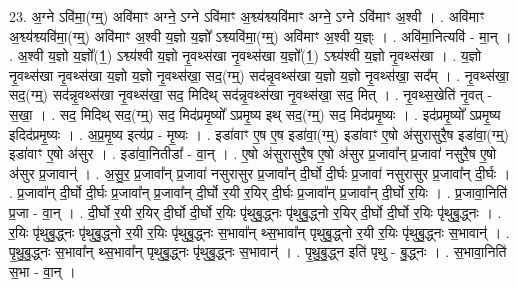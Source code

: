 \documentclass[17pt]{extarticle}
\begin{document}
23. अ॒ग्ने ऽवि॑मा॒(ग्म्॒) अवि॑माꣳ अग्ने॒ ऽग्ने ऽवि॑माꣳ अ॒श्व्य॑श्व्यवि॑माꣳ अग्ने॒ ऽग्ने ऽवि॑माꣳ अ॒श्वी । . अवि॑माꣳ अ॒श्व्य॑श्व्यवि॑मा॒(ग्म्॒) अवि॑माꣳ अ॒श्वी य॒ज्ञो य॒ज्ञो᳚ ऽश्व्यवि॑मा॒(ग्म्॒) अवि॑माꣳ अ॒श्वी य॒ज्ञ्ः । . अवि॑मा॒नित्यवि॑ - मा॒न् । . अ॒श्वी य॒ज्ञो य॒ज्ञो᳚(1॒) ऽश्व्य॑श्वी य॒ज्ञो नृ॒वथ्स॑खा नृ॒वथ्स॑खा य॒ज्ञो᳚(1॒) ऽश्व्य॑श्वी य॒ज्ञो नृ॒वथ्स॑खा । . य॒ज्ञो नृ॒वथ्स॑खा नृ॒वथ्स॑खा य॒ज्ञो य॒ज्ञो नृ॒वथ्स॑खा॒ सद॒(ग्म्॒) सद॑न्नृ॒वथ्स॑खा य॒ज्ञो य॒ज्ञो नृ॒वथ्स॑खा॒ सद᳚म् । . नृ॒वथ्स॑खा॒ सद॒(ग्म्॒) सद॑न्नृ॒वथ्स॑खा नृ॒वथ्स॑खा॒ सद॒ मिदिथ् सद॑न्नृ॒वथ्स॑खा नृ॒वथ्स॑खा॒ सद॒ मित् । . नृ॒वथ्स॒खेति॑ नृ॒वत् - स॒खा॒ । . सद॒ मिदिथ् सद॒(ग्म्॒) सद॒ मिद॑प्रमृ॒ष्यो᳚ ऽप्रमृ॒ष्य इथ् सद॒(ग्म्॒) सद॒ मिद॑प्रमृ॒ष्यः । . इद॑प्रमृ॒ष्यो᳚ ऽप्रमृ॒ष्य इदिद॑प्रमृ॒ष्यः । . अ॒प्र॒मृ॒ष्य इत्य॑प्र - मृ॒ष्यः । . इडा॑वाꣳ ए॒ष ए॒ष इडा॑वा॒(ग्म्॒) इडा॑वाꣳ ए॒षो अ॑सुरासुरै॒ष इडा॑वा॒(ग्म्॒) इडा॑वाꣳ ए॒षो अ॑सुर । . इडा॑वा॒नितीडा᳚ - वा॒न् । . ए॒षो अ॑सुरासुरै॒ष ए॒षो अ॑सुर प्र॒जावा᳚न् प्र॒जावा॑ नसुरै॒ष ए॒षो अ॑सुर प्र॒जावान्॑ । . अ॒सु॒र॒ प्र॒जावा᳚न् प्र॒जावा॑ नसुरासुर प्र॒जावा᳚न् दी॒र्घो दी॒र्घः प्र॒जावा॑ नसुरासुर प्र॒जावा᳚न् दी॒र्घः । . प्र॒जावा᳚न् दी॒र्घो दी॒र्घः प्र॒जावा᳚न् प्र॒जावा᳚न् दी॒र्घो र॒यी र॒यिर् दी॒र्घः प्र॒जावा᳚न् प्र॒जावा᳚न् दी॒र्घो र॒यिः । . प्र॒जावा॒निति॑ प्र॒जा - वा॒न् । . दी॒र्घो र॒यी र॒यिर् दी॒र्घो दी॒र्घो र॒यिः पृ॑थुबु॒द्ध्नः पृ॑थुबु॒द्ध्नो र॒यिर् दी॒र्घो दी॒र्घो र॒यिः पृ॑थुबु॒द्ध्नः । . र॒यिः पृ॑थुबु॒द्ध्नः पृ॑थुबु॒द्ध्नो र॒यी र॒यिः पृ॑थुबु॒द्ध्नः स॒भावा᳚न् थ्स॒भावा᳚न् पृथुबु॒द्ध्नो र॒यी र॒यिः पृ॑थुबु॒द्ध्नः स॒भावान्॑ । . पृ॒थु॒बु॒द्ध्नः स॒भावा᳚न् थ्स॒भावा᳚न् पृथुबु॒द्ध्नः पृ॑थुबु॒द्ध्नः स॒भावान्॑ । . पृ॒थु॒बु॒द्ध्न इति॑ पृथु - बु॒द्ध्नः । . स॒भावा॒निति॑ स॒भा - वा॒न् । \newline
\pagebreak
{}
\end{document}
